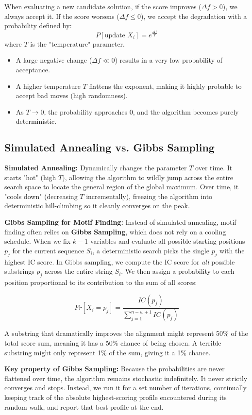 When evaluating a new candidate solution, if the score improves ($\Delta f > 0$), we always accept it. If the score worsens ($\Delta f \leq 0$), we accept the degradation with a probability defined by:
\[
P[\text{update } X_i] = e^{\frac{\Delta f}{T}}
\]
where $T$ is the "temperature" parameter.
\begin{itemize}
  \item A large negative change ($\Delta f \ll 0$) results in a very low probability of acceptance.
  \item A higher temperature $T$ flattens the exponent, making it highly probable to accept bad moves (high randomness).
  \item As $T \to 0$, the probability approaches 0, and the algorithm becomes purely deterministic.
\end{itemize}

\subsection{Simulated Annealing vs. Gibbs Sampling}

\textbf{Simulated Annealing:}
Dynamically changes the parameter $T$ over time. It starts "hot" (high $T$), allowing the algorithm to wildly jump across the entire search space to locate the general region of the global maximum. Over time, it "cools down" (decreasing $T$ incrementally), freezing the algorithm into deterministic hill-climbing so it cleanly converges on the peak.

\textbf{Gibbs Sampling for Motif Finding:}
Instead of simulated annealing, motif finding often relies on \textbf{Gibbs Sampling}, which does not rely on a cooling schedule.
When we fix $k-1$ variables and evaluate all possible starting positions $p_j$ for the current sequence $S_i$, a deterministic search picks the single $p_j$ with the highest IC score. 
In Gibbs sampling, we compute the IC score for \textit{all} possible substrings $p_j$ across the entire string $S_i$. We then assign a probability to each position proportional to its contribution to the sum of all scores:

\[
Pr[X_i = p_j] = \frac{IC(p_j)}{\sum_{j=1}^{n-w+1} IC(p_j)}
\]

A substring that dramatically improves the alignment might represent 50\% of the total score sum, meaning it has a 50\% chance of being chosen. A terrible substring might only represent 1\% of the sum, giving it a 1\% chance. 

\sta \textbf{Key property of Gibbs Sampling:} Because the probabilities are never flattened over time, the algorithm remains stochastic indefinitely. It never strictly converges and stops. Instead, we run it for a set number of iterations, continually keeping track of the absolute highest-scoring profile encountered during its random walk, and report that best profile at the end.

